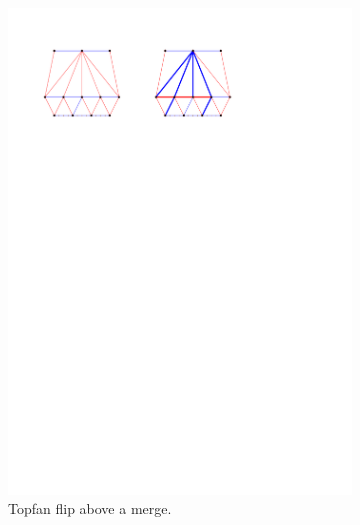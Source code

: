 \begin{figure}[!b]
\begin{subfigure}[b]{0.45 \textwidth}
        \includegraphics[width = \textwidth]{topFanFlips/img/merge}
        \caption{Topfan flip above a merge.}
        \label{fig:fanflip:merge}
    \end{subfigure}
    ~
    \begin{subfigure}[b]{0.45 \textwidth}

\end{subfigure}
\end{figure}
